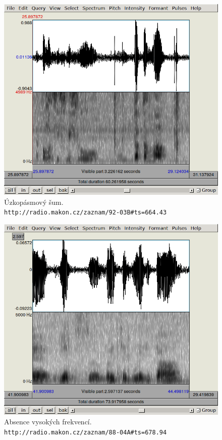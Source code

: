 \begin{figure}[htpb]
\includegraphics[scale=0.89]{rc/spectrum-narrow-92-03B.png}
\caption{
    Úzkopásmový šum.\\
    \texttt{http://radio.makon.cz/zaznam/92-03B\#ts=664.43}
}
\label{fig:spectr-narrow}
\end{figure}

\begin{figure}[htpb]
\includegraphics[scale=0.89]{rc/spectrum-nohighs-88-04A.png}
\caption{
    Absence vysokých frekvencí.\\
    \texttt{http://radio.makon.cz/zaznam/88-04A\#ts=678.94}
}
\label{fig:spectr-nohi}
\end{figure}

